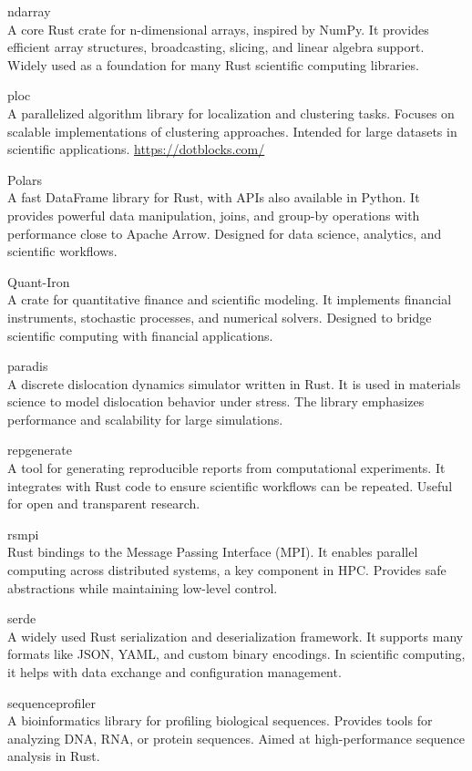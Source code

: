 \documentclass{article}
\begin{document}
ndarray\\
A core Rust crate for n-dimensional arrays, inspired by NumPy. It provides efficient
array structures, broadcasting, slicing, and linear algebra support. Widely used as a foundation
for many Rust scientific computing libraries.

ploc\\
A parallelized algorithm library for localization and clustering tasks. Focuses on scalable
implementations of clustering approaches. Intended for large datasets in scientific applications.
\url{https://dotblocks.com/}

Polars\\
A fast DataFrame library for Rust, with APIs also available in Python. It provides
powerful data manipulation, joins, and group-by operations with performance close to Apache Arrow.
Designed for data science, analytics, and scientific workflows.

Quant-Iron\\
A crate for quantitative finance and scientific modeling. It implements financial
instruments, stochastic processes, and numerical solvers. Designed to bridge scientific computing
with financial applications.

paradis\\
A discrete dislocation dynamics simulator written in Rust. It is used in materials
science to model dislocation behavior under stress. The library emphasizes performance and
scalability for large simulations.

repgenerate\\
A tool for generating reproducible reports from computational experiments. It
integrates with Rust code to ensure scientific workflows can be repeated. Useful for open and
transparent research.

rsmpi\\
Rust bindings to the Message Passing Interface (MPI). It enables parallel computing across
distributed systems, a key component in HPC. Provides safe abstractions while maintaining low-level
control.

serde\\
A widely used Rust serialization and deserialization framework. It supports many formats
like JSON, YAML, and custom binary encodings. In scientific computing, it helps with data exchange
and configuration management.

sequenceprofiler\\
A bioinformatics library for profiling biological sequences. Provides tools for
analyzing DNA, RNA, or protein sequences. Aimed at high-performance sequence analysis in Rust.
\end{document}
